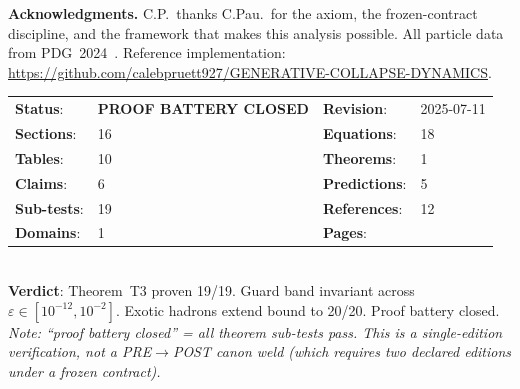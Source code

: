 \documentclass[11pt,a4paper]{article}
\newcommand{\WeldID}{SS1m-CONFINE-T3-2025}
\newcommand{\RevisionDate}{2025-07-11}
\newcommand{\WeldStatus}{\textcolor{WeldGreen}{\textbf{PROOF BATTERY CLOSED}}}
\newcommand{\EIDpages}{\pageref{LastPage}}
\newcommand{\EIDsections}{16}
\newcommand{\EIDequations}{18}
\newcommand{\EIDtables}{10}
\newcommand{\EIDtheorems}{1}
\newcommand{\EIDclaims}{6}
\newcommand{\EIDpredictions}{5}
\newcommand{\EIDsubtests}{19}
\newcommand{\EIDreferences}{12}
\newcommand{\EIDdomains}{1}
\theoremstyle{plain}
\theoremstyle{definition}
\theoremstyle{remark}
\newcommand{\eps}{\varepsilon}
\begin{document}
\begin{tcolorbox}[
  colback=PreambleBox, colframe=HUDGray,
  boxrule=0.4pt, arc=1pt, left=8pt, right=8pt
]
\small\textbf{Acknowledgments.}\enspace
C.P.\ thanks C.Pau.\ for the axiom, the frozen-contract
discipline, and the framework that makes this analysis possible.
All particle data from PDG~2024~\cite{pdg2024}.
Reference implementation:
\url{https://github.com/calebpruett927/GENERATIVE-COLLAPSE-DYNAMICS}.
\end{tcolorbox}

\vspace{4pt}

\begin{tcolorbox}[
  colback=white, colframe=WeldGreen,
  title={\small SS1m Proof-Battery Receipt — \WeldID},
  fonttitle=\bfseries\small,
  boxrule=1pt, arc=2pt, left=6pt, right=6pt
]
\footnotesize
\begin{tabular}{@{}ll@{\qquad}ll@{}}
\textbf{Status}: & \WeldStatus &
  \textbf{Revision}: & \RevisionDate \\
\textbf{Sections}: & \EIDsections &
  \textbf{Equations}: & \EIDequations \\
\textbf{Tables}: & \EIDtables &
  \textbf{Theorems}: & \EIDtheorems \\
\textbf{Claims}: & \EIDclaims &
  \textbf{Predictions}: & \EIDpredictions \\
\textbf{Sub-tests}: & \EIDsubtests &
  \textbf{References}: & \EIDreferences \\
\textbf{Domains}: & \EIDdomains &
  \textbf{Pages}: & \EIDpages \\
\end{tabular}\\[4pt]
\textbf{Verdict}: Theorem~T3 proven 19/19.
Guard band invariant across $\eps\in[10^{-12}, 10^{-2}]$.
Exotic hadrons extend bound to 20/20.
Proof battery closed.
\\[4pt]
{\scriptsize\textit{Note: ``proof battery closed'' = all theorem sub-tests pass.
This is a single-edition verification, not a PRE$\to$POST canon
weld (which requires two declared editions under a frozen contract).}}
\end{tcolorbox}



\end{document}
